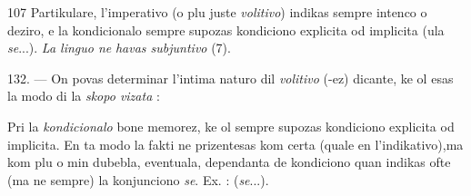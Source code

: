 \begin{VUpage}[111]{107}
Partikulare, l'imperativo (o plu juste \textit{volitivo}) indikas\nl
sempre intenco o deziro, e la kondicionalo sempre supozas\nl
kondiciono explicita od implicita (ula \textit{se}...). \textit{La linguo ne}\nl
\textit{havas subjuntivo} (7).

\VUblanc{5.90pt}%
132. --- On povas determinar l'intima naturo dil \textit{volitivo}\nl
(-ez) dicante, ke ol esas la modo di la \textit{skopo vizata} : \nl
{}\nl
{}

Pri la \textit{kondicionalo} bone memorez, ke ol sempre supozas\nl
kondiciono explicita od implicita. En ta modo la fakti ne\nl
prizentesas kom certa (quale en l'indikativo),ma kom plu o\nl
min dubebla, eventuala, dependanta de kondiciono quan\nl
indikas ofte (ma ne sempre) la konjunciono \textit{se}. Ex. : \nl
{} (\textit{se}...).
\end{VUpage}

